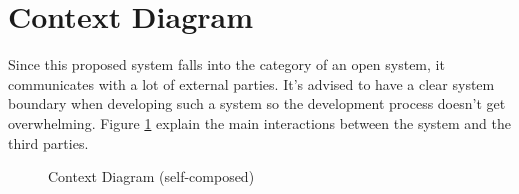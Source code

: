 \section{Context Diagram}

Since this proposed system falls into the category of an open system, it communicates with a lot of external parties. It's advised to have a clear system boundary when developing such a system so the development process doesn't get overwhelming. Figure \ref{fig:context-digram} explain the main interactions between the system and the third parties.

\begin{figure}[H]
    \setlength{\fboxsep}{10pt}
    \caption{Context Diagram (self-composed)}
    \label{fig:context-digram}
\end{figure}
